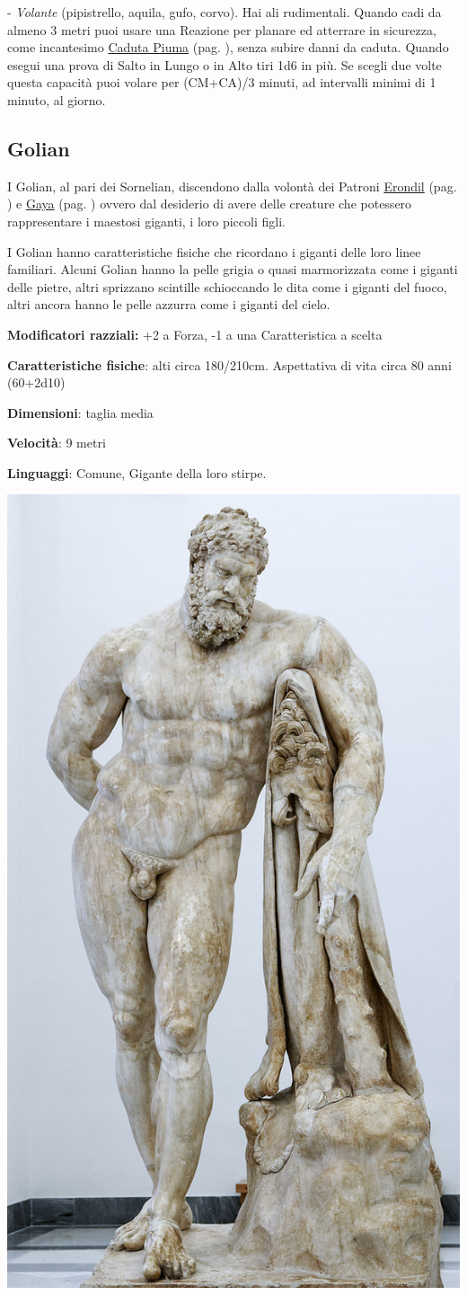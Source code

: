 \begin{multicols}{2}
- \emph{Volante} (pipistrello, aquila, gufo, corvo). Hai ali rudimentali. Quando cadi da almeno 3 metri puoi usare una Reazione per planare ed atterrare in sicurezza, come incantesimo \hyperlink{cadutapiuma}{Caduta Piuma} (pag. \pageref{cadutapiuma}), senza subire danni da caduta. Quando esegui una prova di Salto in Lungo o in Alto tiri 1d6 in più. Se scegli due volte questa capacità puoi volare per (CM+CA)/3 minuti, ad intervalli minimi di 1 minuto, al giorno.

\subsection{Golian}\label{golian}\hypertarget{golian}{}

I Golian, al pari dei Sornelian, discendono dalla volontà dei Patroni \hyperlink{erondil}{Erondil} (pag. \pageref{erondil}) e \hyperlink{gaya}{Gaya} (pag. \pageref{gaya}) ovvero dal desiderio di avere delle creature che potessero rappresentare i maestosi giganti, i loro piccoli figli.

I Golian hanno caratteristiche fisiche che ricordano i giganti delle loro linee familiari. Alcuni Golian hanno la pelle grigia o quasi marmorizzata come i giganti delle pietre, altri sprizzano scintille schioccando le dita come i giganti del fuoco, altri ancora hanno le pelle azzurra come i giganti del cielo.

\textbf{Modificatori razziali:} +2 a Forza, -1 a una Caratteristica a scelta

\textbf{Caratteristiche fisiche}: alti circa 180/210cm. Aspettativa di vita circa 80 anni (60+2d10)

\textbf{Dimensioni}: taglia media

\textbf{Velocità}: 9 metri

\textbf{Linguaggi}: Comune, Gigante della loro stirpe.


\begin{center}
	\includegraphics[height=0.8\linewidth]{immagini/Herakles_Farnese_MAN_Napoli_Inv6001_n01.png}


\end{center}
\end{multicols}
